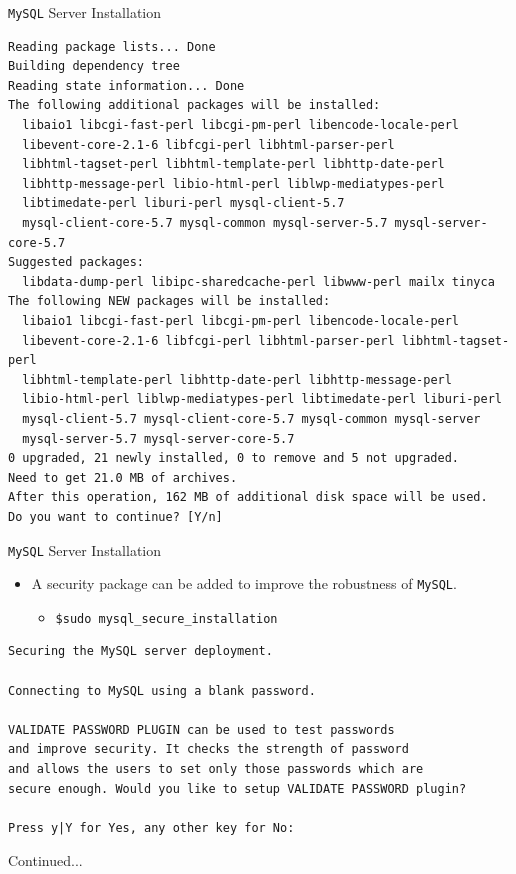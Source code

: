 \documentclass[xcolor=table,aspectratio=169]{beamer}
\begin{document}
\begin{frame}[fragile]{\texttt{MySQL} Server Installation}
  \begin{tcolorbox}
    \lstset{
      basicstyle=\tiny\ttfamily,
    }
    \begin{lstlisting}
Reading package lists... Done
Building dependency tree
Reading state information... Done
The following additional packages will be installed:
  libaio1 libcgi-fast-perl libcgi-pm-perl libencode-locale-perl
  libevent-core-2.1-6 libfcgi-perl libhtml-parser-perl 
  libhtml-tagset-perl libhtml-template-perl libhttp-date-perl 
  libhttp-message-perl libio-html-perl liblwp-mediatypes-perl 
  libtimedate-perl liburi-perl mysql-client-5.7
  mysql-client-core-5.7 mysql-common mysql-server-5.7 mysql-server-core-5.7
Suggested packages:
  libdata-dump-perl libipc-sharedcache-perl libwww-perl mailx tinyca
The following NEW packages will be installed:
  libaio1 libcgi-fast-perl libcgi-pm-perl libencode-locale-perl
  libevent-core-2.1-6 libfcgi-perl libhtml-parser-perl libhtml-tagset-perl
  libhtml-template-perl libhttp-date-perl libhttp-message-perl 
  libio-html-perl liblwp-mediatypes-perl libtimedate-perl liburi-perl 
  mysql-client-5.7 mysql-client-core-5.7 mysql-common mysql-server 
  mysql-server-5.7 mysql-server-core-5.7
0 upgraded, 21 newly installed, 0 to remove and 5 not upgraded.
Need to get 21.0 MB of archives.
After this operation, 162 MB of additional disk space will be used.
Do you want to continue? [Y/n]
    \end{lstlisting}
  \end{tcolorbox}
\end{frame}

\begin{frame}[fragile]{\texttt{MySQL} Server Installation}
  \begin{itemize}
    \item A security package can be added to improve the robustness of \texttt{MySQL}.
    \begin{itemize}
      \item \texttt{\$sudo mysql\_secure\_installation}
    \end{itemize}
  \end{itemize}
  \begin{tcolorbox}
    \lstset{
      basicstyle=\tiny\ttfamily,
    }
    \begin{lstlisting}
Securing the MySQL server deployment.
    
Connecting to MySQL using a blank password.
      
VALIDATE PASSWORD PLUGIN can be used to test passwords
and improve security. It checks the strength of password
and allows the users to set only those passwords which are
secure enough. Would you like to setup VALIDATE PASSWORD plugin?
      
Press y|Y for Yes, any other key for No:
    \end{lstlisting}
  \end{tcolorbox}
Continued...
\end{frame}
\end{document}
